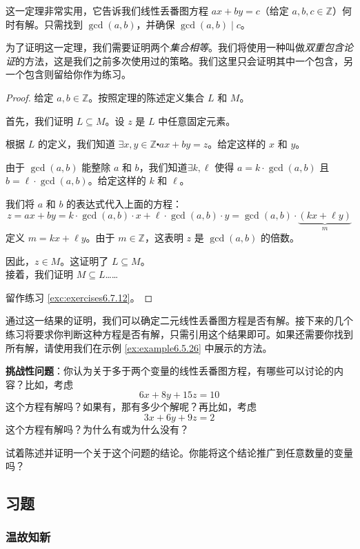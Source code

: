 这一定理非常实用，它告诉我们线性丢番图方程 $ax + by = c$（给定 $a, b, c \in \mathbb{Z}$）何时有解。只需找到 $\gcd(a, b)$，并确保 $\gcd(a, b) \mid c$。

为了证明这一定理，我们需要证明两个\emph{集合相等}。我们将使用一种叫做\emph{双重包含论证}的方法，这是我们之前多次使用过的策略。我们这里只会证明其中一个包含，另一个包含则留给你作为练习。

\begin{proof}
    给定 $a, b \in \mathbb{Z}$。按照定理的陈述定义集合 $L$ 和 $M$。

    首先，我们证明 $L \subseteq M$。设 $z$ 是 $L$ 中任意固定元素。

    根据 $L$ 的定义，我们知道 $\exists x, y \in \mathbb{Z} \centerdot ax + by = z$。给定这样的 $x$ 和 $y$。

    由于 $\gcd(a, b)$ 能整除 $a$ 和 $b$，我们知道$\exists k, \ell$ 使得 $a = k \cdot \gcd(a, b)$ 且 $b = \ell  \cdot \gcd(a, b)$。给定这样的 $k$ 和 $\ell$。

    我们将 $a$ 和 $b$ 的表达式代入上面的方程：
    \[z = ax + by = k \cdot \gcd(a, b) \cdot x + \ell \cdot \gcd(a, b) \cdot y = \gcd(a, b) \cdot \underbrace{(kx + \ell y)}_{m}\]
    定义 $m = kx + \ell y$。由于 $m \in \mathbb{Z}$，这表明 $z$ 是 $\gcd(a, b)$ 的倍数。

    因此，$z \in M$。这证明了 $L \subseteq M$。\\

    接着，我们证明 $M \subseteq L$……

    留作练习 \ref{exc:exercises6.7.12}。
\end{proof}

通过这一结果的证明，我们可以确定二元线性丢番图方程是否有解。接下来的几个练习将要求你判断这种方程是否有解，只需引用这个结果即可。如果还需要你找到所有解，请使用我们在示例 \ref{ex:example6.5.26} 中展示的方法。

\textbf{挑战性问题}：你认为关于多于两个变量的线性丢番图方程，有哪些可以讨论的内容？比如，考虑
\[6x + 8y + 15z = 10\]
这个方程有解吗？如果有，那有多少个解呢？再比如，考虑
\[3x + 6y + 9z = 2\]
这个方程有解吗？为什么有或为什么没有？

试着陈述并证明一个关于这个问题的结论。你能将这个结论推广到任意数量的变量吗？

\subsection{习题}

\subsubsection*{温故知新}

